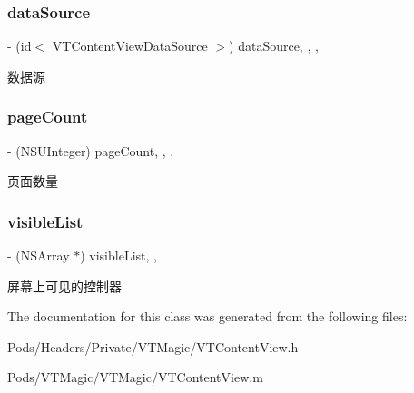 \subsubsection{\texorpdfstring{data\+Source}{dataSource}}
{\footnotesize\ttfamily -\/ (id$<$ V\+T\+Content\+View\+Data\+Source $>$) data\+Source\hspace{0.3cm}{\ttfamily [read]}, {\ttfamily [write]}, {\ttfamily [nonatomic]}, {\ttfamily [weak]}}

数据源 \mbox{\label{interface_v_t_content_view_a7b78106bc3c803138d0b0470717b4c31}} 
\subsubsection{\texorpdfstring{page\+Count}{pageCount}}
{\footnotesize\ttfamily -\/ (N\+S\+U\+Integer) page\+Count\hspace{0.3cm}{\ttfamily [read]}, {\ttfamily [write]}, {\ttfamily [nonatomic]}, {\ttfamily [assign]}}

页面数量 \mbox{\label{interface_v_t_content_view_af9c2b1000672aa1ebbe7d145d5b56729}} 
\subsubsection{\texorpdfstring{visible\+List}{visibleList}}
{\footnotesize\ttfamily -\/ (N\+S\+Array $\ast$) visible\+List\hspace{0.3cm}{\ttfamily [read]}, {\ttfamily [nonatomic]}, {\ttfamily [strong]}}

屏幕上可见的控制器 

The documentation for this class was generated from the following files\+:\begin{DoxyCompactItemize}
\item 
Pods/\+Headers/\+Private/\+V\+T\+Magic/V\+T\+Content\+View.\+h\item 
Pods/\+V\+T\+Magic/\+V\+T\+Magic/V\+T\+Content\+View.\+m\end{DoxyCompactItemize}
